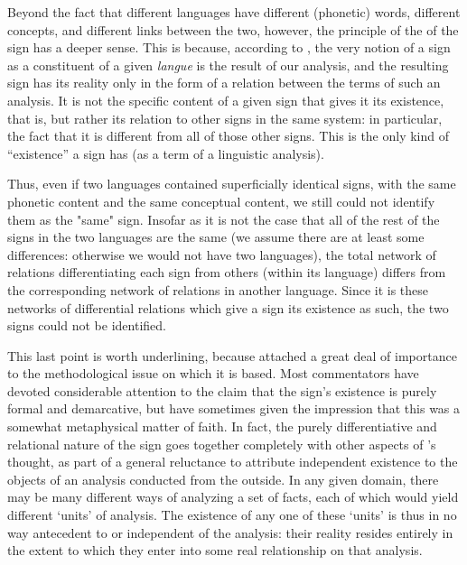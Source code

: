 Beyond the fact that different languages have different (phonetic)
words, different concepts, and different links between the two,
however, the principle of the  of the sign has a deeper
sense.  This is because, according to {\Saussure}, the very notion of a
sign as a constituent of a given \emph{langue} is the result of
our analysis, and the resulting sign has its reality only in the form
of a relation between the terms of such an analysis.  It is not the
specific content of a given sign that gives it its existence, that is,
but rather its relation to other signs in the same system: in
particular, the fact that it is different from all of those other
signs. This is the only kind of ``existence'' a sign has (as a term of
a linguistic analysis).

Thus, even if two languages contained superficially identical signs,
with the same phonetic content and the same conceptual content, we
still could not identify them as the "same" sign.  Insofar as it is
not the case that all of the rest of the signs in the two languages
are the same (we assume there are at least some differences: otherwise
we would not have two languages), the total network of relations
differentiating each sign from others (within its language) differs
from the corresponding network of relations in another language.
Since it is these networks of differential relations which give a sign
its existence as such, the two signs could not be identified.

This last point is worth underlining, because {\Saussure} attached a
great deal of importance to the methodological issue on which it is
based.  Most commentators have devoted considerable attention to the
claim that the sign's existence is purely formal and demarcative, but
have sometimes given the impression that this was a somewhat
metaphysical matter of faith.  In fact, the purely differentiative and
relational nature of the sign goes together completely with other
aspects of {\Saussure}'s thought, as part of a general reluctance to
attribute independent existence to the objects of an analysis
conducted from the outside.  In any given domain, there may be many
different ways of analyzing a set of facts, each of which would yield
different `units' of analysis.  The existence of any one of these
`units' is thus in no way antecedent to or independent of the
analysis: their reality resides entirely in the extent to which they
enter into some real relationship on that analysis.


